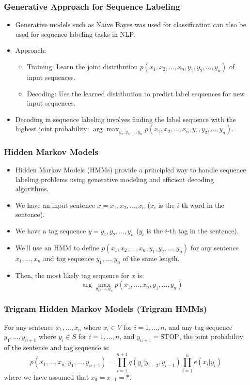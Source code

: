 \documentclass[handout]{beamer}
\begin{document}
\begin{frame}
  \frametitle{Generative Approach for Sequence Labeling}
  \scriptsize
  \begin{itemize}
    \item Generative models such as Naive Bayes was used for classification can also be used for sequence labeling tasks in NLP.
    \item Approach:
    \begin{itemize}\scriptsize
      \item Training: Learn the joint distribution $p(x_1,x_2, \ldots, x_n,y_1, y_2, \ldots, y_n)$ of input sequences.
      \item Decoding: Use the learned distribution to predict label sequences for new input sequences.
    \end{itemize}
      \item Decoding in sequence labeling involves finding the label sequence with the highest joint probability: $\arg\max_{y_1, y_2, \ldots, y_n}p(x_1,x_2, \ldots, x_n,y_1, y_2, \ldots, y_n)$.
  \end{itemize}
\end{frame}






\begin{frame}
  \frametitle{Hidden Markov Models}
  \scriptsize
  \begin{itemize}
    \item  Hidden Markov Models (HMMs) provide a principled way to handle sequence labeling problems using generative modeling and efficient decoding algorithms.
    \item We have an input sentence $x = x_1, x_2, \ldots, x_n$ ($x_i$ is the $i$-th word in the sentence).
    \item We have a tag sequence $y = y_1, y_2, \ldots, y_n$ ($y_i$ is the $i$-th tag in the sentence).
    \item We'll use an HMM to define $p(x_1, x_2, \ldots, x_n, y_1, y_2, \ldots, y_n)$ for any sentence $x_1, \ldots, x_n$ and tag sequence $y_1, \ldots, y_n$ of the same length. \cite{kupiec1992robust}
    \item Then, the most likely tag sequence for $x$ is:
    \[
      \arg\max_{y_1,\ldots,y_n} p(x_1, \ldots, x_n, y_1, \ldots, y_n)
    \]
  \end{itemize}
\end{frame}

\begin{frame}
  \frametitle{Trigram Hidden Markov Models (Trigram HMMs)}
  For any sentence $x_1, \ldots, x_n$ where $x_i \in V$ for $i = 1, \ldots, n$, and any tag sequence $y_1, \ldots, y_{n+1}$ where $y_i \in S$ for $i = 1, \ldots, n$, and $y_{n+1} = \text{STOP}$, the joint probability of the sentence and tag sequence is:
  \[
    p(x_1, \ldots, x_n, y_1, \ldots, y_{n+1}) = \prod_{i=1}^{n+1} q(y_i | y_{i-2}, y_{i-1}) \prod_{i=1}^{n} e(x_i | y_i)
  \]
  where we have assumed that $x_0 = x_{-1} = *$.
\end{frame}
\end{document}
